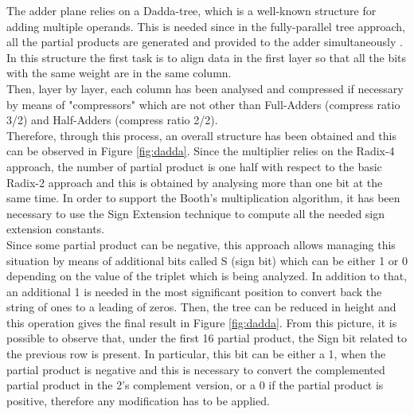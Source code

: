 \documentclass[a4paper, titlepage]{article}
\begin{document}
The adder plane relies on a Dadda-tree, which is a well-known structure for adding multiple operands. This is needed since in the fully-parallel tree approach, all the partial products are generated and provided to the adder simultaneously . 
\newline
In this structure the first task is to align data 
in the first layer so that all the bits with the same weight are in the same column.
\\
Then, layer by layer, each column has been analysed and compressed if necessary by means of "compressors" which are not other than Full-Adders (compress ratio 3/2) and Half-Adders (compress ratio 2/2).\\Therefore, through this process, an overall structure has been obtained and this can be observed in Figure \ref{fig:dadda}.
\newline
Since the multiplier relies on the Radix-4 approach, the number of partial product is one half with respect to the basic Radix-2 approach and this is obtained by analysing more than one bit at the same time. 
\newline
In order to support the Booth's multiplication algorithm, it has been necessary to use the Sign Extension technique to compute all the needed sign extension constants.\\
Since some partial product can be negative, this approach allows managing %
this situation by means of additional bits called S (sign bit) which can be either 1 or 0 depending on the value of the triplet which is being analyzed. In addition to that, an additional 1 is needed in the most significant position to convert back the string of ones to a leading of zeros. Then, the tree can be reduced in height and this operation gives the final result in Figure \ref{fig:dadda}. From this picture, it is possible to observe that, under the first 16 partial product, 
the Sign bit related to the previous row is present. In particular, this bit can be either a 1, when the partial product is negative and this is necessary to convert the complemented partial product in the 2's complement version, or a 0 if the partial product is positive, therefore any modification has to be applied.
\end{document}
